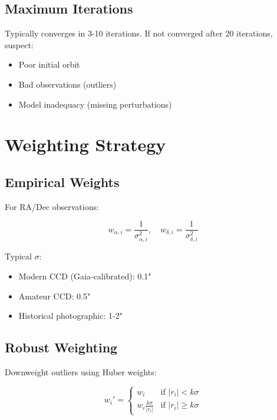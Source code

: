 \subsection{Maximum Iterations}

Typically converges in 3-10 iterations. If not converged after 20 iterations, suspect:
\begin{itemize}
    \item Poor initial orbit
    \item Bad observations (outliers)
    \item Model inadequacy (missing perturbations)
\end{itemize}

\section{Weighting Strategy}

\subsection{Empirical Weights}

For RA/Dec observations:

\begin{equation}
    w_{\alpha,i} = \frac{1}{\sigma_{\alpha,i}^2}, \quad w_{\delta,i} = \frac{1}{\sigma_{\delta,i}^2}
\end{equation}

Typical $\sigma$:
\begin{itemize}
    \item Modern CCD (Gaia-calibrated): 0.1"
    \item Amateur CCD: 0.5"
    \item Historical photographic: 1-2"
\end{itemize}

\subsection{Robust Weighting}

Downweight outliers using Huber weights:

\begin{equation}
    w_i' = \begin{cases}
        w_i & \text{if } |r_i| < k\sigma \\
        w_i \frac{k\sigma}{|r_i|} & \text{if } |r_i| \ge k\sigma
    \end{cases}
\end{equation}


